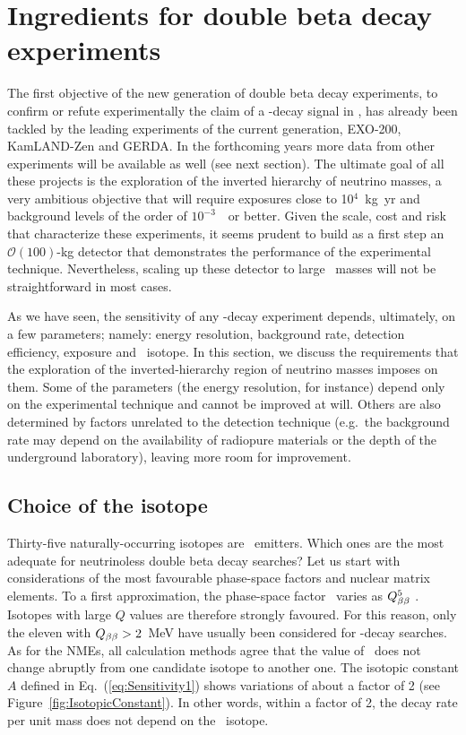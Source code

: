 \documentclass{PoS}
\begin{document}
\section{Ingredients for double beta decay experiments} 
The first objective of the new generation of double beta decay experiments, to confirm or refute experimentally the claim of a \bbonu-decay signal in \GE, has already been tackled by the leading experiments of the current generation,  EXO-200, KamLAND-Zen and GERDA. In the forthcoming years  more data from other experiments will be available as well (see next section). The ultimate goal of all these projects is the exploration of the inverted hierarchy of neutrino masses, a very ambitious objective that will require exposures close to 10$^{4}$~kg~yr and background levels of the order of $10^{-3}$~\ckky\ or better. Given the scale, cost and risk that characterize these experiments, it seems prudent to build as a first step an $\mathcal{O}(100)$-kg detector that demonstrates the performance of the experimental technique. Nevertheless, scaling up these detector to large \bb\ masses will not be straightforward in most cases. 

As we have seen, the sensitivity of any \bbonu-decay experiment depends, ultimately, on a few parameters; namely: energy resolution, background rate, detection efficiency, exposure and \bb\ isotope. In this section, we discuss the requirements that the exploration of the inverted-hierarchy region of neutrino masses imposes on them. 
Some of the parameters (the energy resolution, for instance) depend only on the experimental technique and cannot be improved at will. Others are also determined by factors unrelated to the detection technique (e.g.\ the background rate may depend on the availability of radiopure materials or the depth of the underground laboratory), leaving more room for improvement.



\subsection{Choice of the isotope} \label{subsec:Isotope}
Thirty-five naturally-occurring isotopes are \bb\ emitters. Which ones are the most adequate for neutrinoless double beta decay searches? Let us start with considerations of the most favourable phase-space factors and nuclear matrix elements. To a first approximation, the phase-space factor \Gonu\ varies as $Q_{\beta\beta}^5$ \cite{Kotila:2012zza}. Isotopes with large $Q$ values are therefore strongly favoured. For this reason, only the eleven with $Q_{\beta\beta}>2$~MeV have usually been considered for \bbonu-decay searches. As for the NMEs, all calculation methods agree that the value of \Monu\ does not change abruptly from one candidate isotope to another one. The isotopic constant ${A}$ defined in Eq.~(\ref{eq:Sensitivity1}) shows variations of about a factor of 2 (see Figure~\ref{fig:IsotopicConstant}). In other words, within a factor of 2, the decay rate per unit mass does not depend on the \bb\ isotope.
\end{document}
